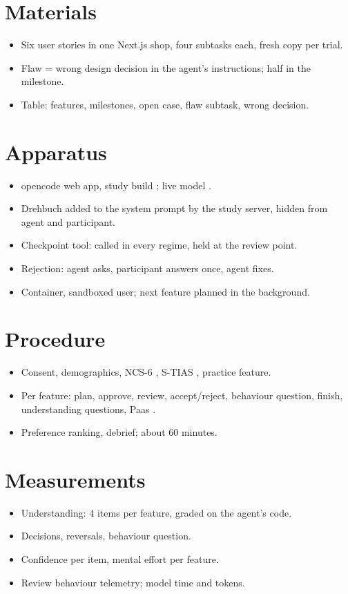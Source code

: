 \section{Materials}
\begin{itemize}
  \item Six user stories in one Next.js shop, four subtasks each, fresh copy per trial.
  \item Flaw = wrong design decision in the agent's instructions; half in the milestone.
  \item Table: features, milestones, open case, flaw subtask, wrong decision.
\end{itemize}

\section{Apparatus}
\begin{itemize}
  \item opencode web app, study build \citep{opencode_2026}; live model \citep{deepseek_2026}.
  \item Drehbuch added to the system prompt by the study server, hidden from agent and participant.
  \item Checkpoint tool: called in every regime, held at the review point.
  \item Rejection: agent asks, participant answers once, agent fixes.
  \item Container, sandboxed user; next feature planned in the background.
\end{itemize}

\section{Procedure}
\begin{itemize}
  \item Consent, demographics, NCS-6 \citep{coelho_very_2018}, S-TIAS \citep{mcgrath_measuring_2025}, practice feature.
  \item Per feature: plan, approve, review, accept/reject, behaviour question, finish, understanding questions, Paas \citep{paas_training_1992}.
  \item Preference ranking, debrief; about 60 minutes.
\end{itemize}

\section{Measurements}
\begin{itemize}
  \item Understanding: 4 items per feature, graded on the agent's code.
  \item Decisions, reversals, behaviour question.
  \item Confidence per item, mental effort per feature.
  \item Review behaviour telemetry; model time and tokens.
\end{itemize}

